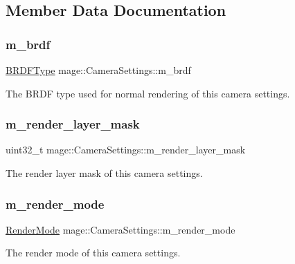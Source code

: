 \subsection{Member Data Documentation}
\hypertarget{structmage_1_1_camera_settings_ac6a51ea7c770af79de4f97b53cab83b7}{}\label{structmage_1_1_camera_settings_ac6a51ea7c770af79de4f97b53cab83b7} 
\subsubsection{\texorpdfstring{m\+\_\+brdf}{m\_brdf}}
{\footnotesize\ttfamily \hyperlink{namespacemage_ae7a7a03a7b34d7e2689689bb8295cd38}{B\+R\+D\+F\+Type} mage\+::\+Camera\+Settings\+::m\+\_\+brdf\hspace{0.3cm}{\ttfamily [private]}}

The B\+R\+DF type used for normal rendering of this camera settings. \hypertarget{structmage_1_1_camera_settings_a21fd14ff3b589a79b1c69b05fbee05cf}{}\label{structmage_1_1_camera_settings_a21fd14ff3b589a79b1c69b05fbee05cf} 
\subsubsection{\texorpdfstring{m\+\_\+render\+\_\+layer\+\_\+mask}{m\_render\_layer\_mask}}
{\footnotesize\ttfamily uint32\+\_\+t mage\+::\+Camera\+Settings\+::m\+\_\+render\+\_\+layer\+\_\+mask\hspace{0.3cm}{\ttfamily [private]}}

The render layer mask of this camera settings. \hypertarget{structmage_1_1_camera_settings_aa4d5139b4e8668c58507ead30812c84b}{}\label{structmage_1_1_camera_settings_aa4d5139b4e8668c58507ead30812c84b} 
\subsubsection{\texorpdfstring{m\+\_\+render\+\_\+mode}{m\_render\_mode}}
{\footnotesize\ttfamily \hyperlink{namespacemage_a5e7e18b0154373ce8fc942fe3f6b27fd}{Render\+Mode} mage\+::\+Camera\+Settings\+::m\+\_\+render\+\_\+mode\hspace{0.3cm}{\ttfamily [private]}}

The render mode of this camera settings. 